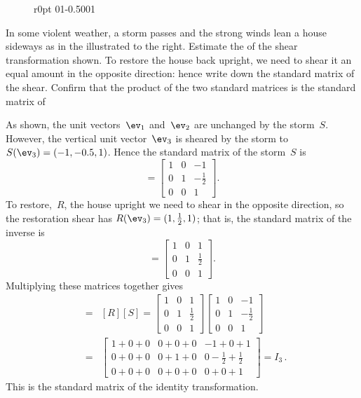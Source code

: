 \begin{figure}[8]r{0pt}
\def\unithousesize{small}
01{-0.5}001
\end{figure}
\begin{example} \label{eg:stormLT}
In some violent weather, a storm passes and the strong winds lean a house sideways as in the  illustrated to the right.
Estimate the  of the shear transformation shown.
To restore the house back upright, we need to shear it an equal amount in the opposite direction: hence write down the standard matrix of the  shear.
Confirm that the product of the two standard matrices is the standard matrix of 
\begin{solution} 
As shown, the unit vectors~\(\ev_1\) and~\(\ev_2\) are unchanged by the storm~\(S\).  
However, the vertical unit vector~\(\ev_3\) is sheared by the storm to \(S(\ev_3)=(-1,-0.5,1)\).
Hence the standard matrix of the storm~\(S\) is
\begin{equation*}
[S]=\begin{bmatrix} 1&0&-1\\0&1&-\tfrac12\\0&0&1 \end{bmatrix}.
\end{equation*}
To restore,~\(R\), the house upright we need to shear in the opposite direction, so the restoration shear has \(R(\ev_3)=(1,\tfrac12,1)\); that is, the standard matrix of the inverse is
\begin{equation*}
[R]=\begin{bmatrix} 1&0&1\\0&1&\tfrac12\\0&0&1 \end{bmatrix}.
\end{equation*}
Multiplying these matrices together gives
\begin{eqnarray*}
[R\circ S]&=&[R][S]
=\begin{bmatrix} 1&0&1\\0&1&\tfrac12\\0&0&1 \end{bmatrix}
\begin{bmatrix} 1&0&-1\\0&1&-\tfrac12\\0&0&1 \end{bmatrix}
\\&=&\begin{bmatrix} 1+0+0&0+0+0&-1+0+1\\
0+0+0&0+1+0&0-\tfrac12+\tfrac12\\
0+0+0&0+0+0&0+0+1 \end{bmatrix}
=I_3\,.
\end{eqnarray*}
This is the standard matrix of the identity transformation.
\end{solution}
\end{example}


